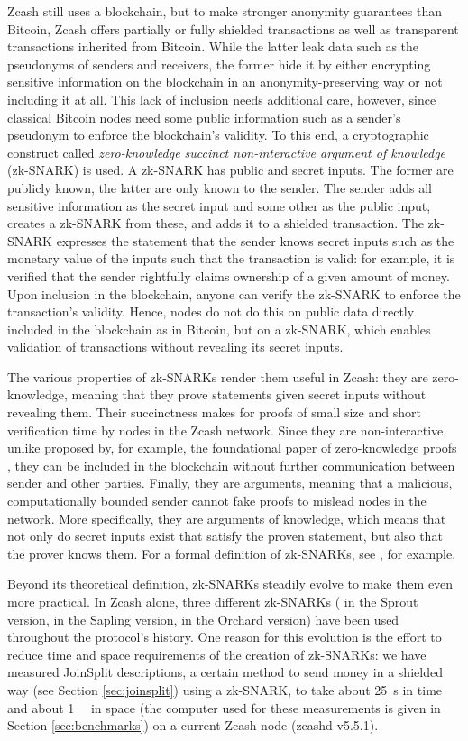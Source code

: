 \documentclass{article}
\begin{document}
Zcash still uses a blockchain, but to make stronger anonymity guarantees than Bitcoin, Zcash offers partially or fully shielded transactions as well as transparent transactions inherited from Bitcoin.
While the latter leak data such as the pseudonyms of senders and receivers, the former hide it by either encrypting sensitive information on the blockchain in an anonymity-preserving way or not including it at all.
This lack of inclusion needs additional care, however, since classical Bitcoin nodes need some public information such as a sender's pseudonym to enforce the blockchain's validity.
To this end, a cryptographic construct called \textit{zero-knowledge succinct non-interactive argument of knowledge} (zk-SNARK) is used.
A zk-SNARK has public and secret inputs.
The former are publicly known, the latter are only known to the sender.
The sender adds all sensitive information as the secret input and some other as the public input, creates a zk-SNARK from these, and adds it to a shielded transaction.
The zk-SNARK expresses the statement that the sender knows secret inputs such as the monetary value of the inputs such that the transaction is valid:
for example, it is verified that the sender rightfully claims ownership of a given amount of money.
Upon inclusion in the blockchain, anyone can verify the zk-SNARK to enforce the transaction's validity.
Hence, nodes do not do this on public data directly included in the blockchain as in Bitcoin, but on a zk-SNARK, which enables validation of transactions without revealing its secret inputs.

The various properties of zk-SNARKs render them useful in Zcash: they are zero-knowledge, meaning that they prove statements given secret inputs without revealing them.
Their succinctness makes for proofs of small size and short verification time by nodes in the Zcash network.
Since they are non-interactive, unlike proposed by, for example, the foundational paper of zero-knowledge proofs \cite{goldwasser:zk}, they can be included in the blockchain without further communication between sender and other parties.
Finally, they are arguments, meaning that a malicious, computationally bounded sender cannot fake proofs to mislead nodes in the network.
More specifically, they are arguments of knowledge, which means that not only do secret inputs exist that satisfy the proven statement, but also that the prover knows them.
For a formal definition of zk-SNARKs, see \cite{groth:zksnark}, for example.

Beyond its theoretical definition, zk-SNARKs steadily evolve to make them even more practical.
In Zcash alone, three different zk-SNARKs (\cite{bensasson:zksnark} in the Sprout version, \cite{groth:zksnark} in the Sapling version, \cite{zcash:halo2} in the Orchard version) have been used throughout the protocol's history.
One reason for this evolution is the effort to reduce time and space requirements of the creation of zk-SNARKs:
we have measured JoinSplit descriptions, a certain method to send money in a shielded way (see Section \ref{sec:joinsplit}) using a zk-SNARK, to take about \SI{25}{\second} in time and about \SI{1}{\gibi\byte} in space (the computer used for these measurements is given in Section \ref{sec:benchmarks}) on a current Zcash node (zcashd v5.5.1).
\end{document}
